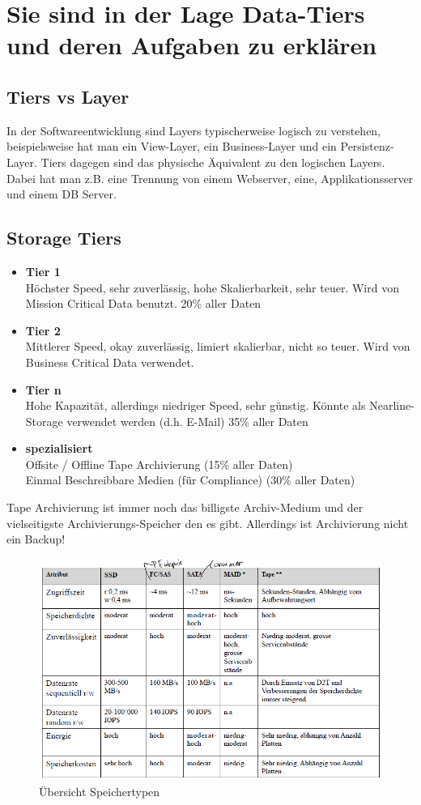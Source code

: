 \section{Sie sind in der Lage Data-Tiers und deren Aufgaben zu erklären}
\subsection{Tiers vs Layer}
In der Softwareentwicklung sind Layers typischerweise logisch zu verstehen, beispielsweise hat man ein View-Layer, ein Business-Layer und ein Persistenz-Layer. Tiers dagegen sind das physische Äquivalent zu den logischen Layers. Dabei hat man z.B. eine Trennung von einem Webserver, eine, Applikationsserver und einem DB Server.
\subsection{Storage Tiers}
\begin{itemize}
	\item \textbf{Tier 1} \\
		Höchster Speed, sehr zuverlässig, hohe Skalierbarkeit, sehr teuer. Wird von Mission Critical Data benutzt.
		20\% aller Daten
	\item \textbf{Tier 2} \\
		Mittlerer Speed, okay zuverlässig, limiert skalierbar, nicht so teuer. Wird von Business Critical Data verwendet.
	\item \textbf{Tier n} \\
		Hohe Kapazität, allerdings niedriger Speed, sehr günstig. Könnte als Nearline-Storage verwendet werden (d.h. E-Mail)
		35\% aller Daten
	\item \textbf{spezialisiert} \\
		Offsite / Offline Tape Archivierung (15\% aller Daten) \\
		Einmal Beschreibbare Medien (für Compliance)
		(30\% aller Daten)
\end{itemize}
Tape Archivierung ist immer noch das billigste Archiv-Medium und der vielseitigste Archivierungs-Speicher den es gibt. Allerdings ist Archivierung nicht ein Backup!
\begin{figure}
	\centering
	\includegraphics[width=0.9\linewidth]{fig/speichertypen}
	\caption{Übersicht Speichertypen}
	\label{fig:speichertypen}
\end{figure}
